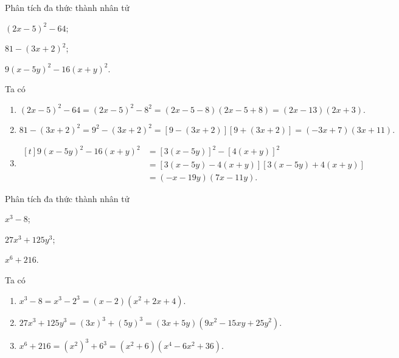 \begin{vd}
	Phân tích đa thức thành nhân tử
	\begin{listEX}[3]
		\item $(2x-5)^2 - 64$;
		\item $81 - (3x+2)^2$;
		\item $9(x-5y)^2 - 16(x+y)^2$.
	\end{listEX}
	\loigiai 
	{
		Ta có
		\begin{enumerate}
			\item $(2x-5)^2 - 64 = (2x-5)^2 - 8^2 = (2x-5-8)(2x-5+8) = (2x-13)(2x+3).$
			\item $81-(3x+2)^2 = 9^2 - (3x+2)^2 = [9-(3x+2)][9+(3x+2)] = (-3x+7)(3x+11).$
			\item {\allowdisplaybreaks
				$\begin{aligned}[t]9(x-5y)^2 - 16(x+y)^2 &= \left[3(x-5y)\right]^2 - \left[4(x+y)\right]^2 \\
			&= \left[3(x-5y) - 4(x+y)\right]\left[3(x-5y) + 4(x+y)\right] \\
			&= (-x-19y)(7x-11y).\end{aligned}$}
			
		\end{enumerate}
	}
\end{vd}

\begin{vd}
	Phân tích đa thức thành nhân tử
	\begin{listEX}[3]
		\item $x^3 - 8$;
		\item $27x^3 + 125y^3$;
		\item $x^6 + 216$.
	\end{listEX}
	\loigiai 
	{
		Ta có
		\begin{enumerate}
			\item $x^3 - 8 = x^3 - 2^3 = (x-2)\left(x^2 + 2x + 4\right).$
			\item $27x^3 + 125y^3 = (3x)^3 + (5y)^3 = (3x+5y)\left(9x^2 - 15xy + 25y^2\right).$
			\item $x^6 + 216 = \left(x^2\right)^3 + 6^3 = \left(x^2 + 6\right)\left(x^4 - 6x^2 + 36\right).$
		\end{enumerate}
	}
\end{vd}

